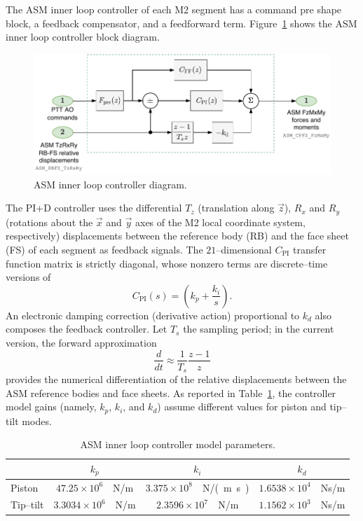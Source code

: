 The ASM inner loop controller of each M2 segment has a command pre shape block, a feedback compensator, and a feedforward term. Figure~\ref{fig:asm_ctrl_diagram} shows the ASM inner loop controller block diagram. %
%
\begin{figure}[!hbt]
  \vspace{6pt}
  \centering
  \includegraphics[width=\textwidth]{./ctrl_sec_images/pttASM_inner_loop.pdf}
  \caption{ASM inner loop controller diagram.}
  \label{fig:asm_ctrl_diagram}
\end{figure}
%
The PI+D controller uses the differential $T_z$ (translation along $\overrightarrow{z}$), $R_x$ and $R_y$ (rotations about the $\overrightarrow{x}$ and $\overrightarrow{y}$ axes of the M2 local coordinate system, respectively) displacements between the reference body (RB) and the face sheet (FS) of each segment as feedback signals. %
The $21$--dimensional $C_\text{PI}$ transfer function matrix is strictly diagonal, whose nonzero terms are discrete--time versions of
\begin{equation*}
C_\text{PI}(s) = \left(k_p + \frac{k_i}{s} \right).
\end{equation*}
An electronic damping correction (derivative action) proportional to $k_d$ also composes the feedback controller. Let $T_s$ the sampling period; in the current version, the forward approximation $$\frac{d}{dt} \approx \frac{1}{T_s}\frac{z-1}{z}$$ provides the numerical differentiation of the relative displacements between the ASM reference bodies and face sheets. %
%
As reported in Table~\ref{tab:ASM_inner_ctrl_par}, the controller model gains (namely, $k_p$, $k_i$, and $k_d$) assume different values for piston and tip--tilt modes.
\begin{table}[!htb]
  \centering
  \caption{ASM inner loop controller model parameters.}
  \label{tab:ASM_inner_ctrl_par}
  \begin{tabular}{l|ccc}
  & $k_p$ & $k_i$ & $k_d$\\
  \hline
  Piston & $47.25 \times 10^6$~\SI{}{N/m} & $3.375 \times 10^8$~\SI{}{N/(m s)} & $1.6538 \times 10^4$~\SI{}{Ns/m}\\
  Tip--tilt & $3.3034 \times 10^6$~\SI{}{N/m} & $2.3596 \times 10^7$~\SI{}{N/m} & $1.1562 \times 10^3$~\SI{}{Ns/m}\\
  \end{tabular}
  \end{table}

